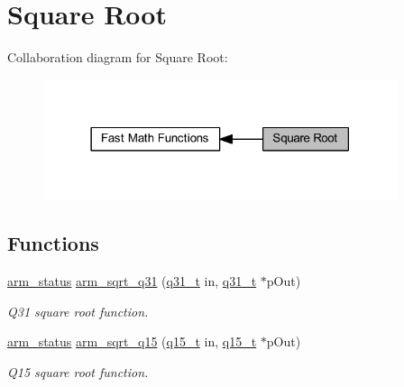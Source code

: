 \hypertarget{group___s_q_r_t}{}\section{Square Root}
\label{group___s_q_r_t}
Collaboration diagram for Square Root\+:
\nopagebreak
\begin{figure}[H]
\begin{center}
\leavevmode
\includegraphics[width=294pt]{group___s_q_r_t}
\end{center}
\end{figure}
\subsection*{Functions}
\begin{DoxyCompactItemize}
\item 
\hyperlink{arm__math_8h_a5e459c6409dfcd2927bb8a57491d7cf6}{arm\+\_\+status} \hyperlink{group___s_q_r_t_ga119e25831e141d734d7ef10636670058}{arm\+\_\+sqrt\+\_\+q31} (\hyperlink{arm__math_8h_adc89a3547f5324b7b3b95adec3806bc0}{q31\+\_\+t} in, \hyperlink{arm__math_8h_adc89a3547f5324b7b3b95adec3806bc0}{q31\+\_\+t} $\ast$p\+Out)
\begin{DoxyCompactList}\small\item\em Q31 square root function. \end{DoxyCompactList}\item 
\hyperlink{arm__math_8h_a5e459c6409dfcd2927bb8a57491d7cf6}{arm\+\_\+status} \hyperlink{group___s_q_r_t_ga5abe5ca724f3e15849662b03752c1238}{arm\+\_\+sqrt\+\_\+q15} (\hyperlink{arm__math_8h_ab5a8fb21a5b3b983d5f54f31614052ea}{q15\+\_\+t} in, \hyperlink{arm__math_8h_ab5a8fb21a5b3b983d5f54f31614052ea}{q15\+\_\+t} $\ast$p\+Out)
\begin{DoxyCompactList}\small\item\em Q15 square root function. \end{DoxyCompactList}\end{DoxyCompactItemize}


